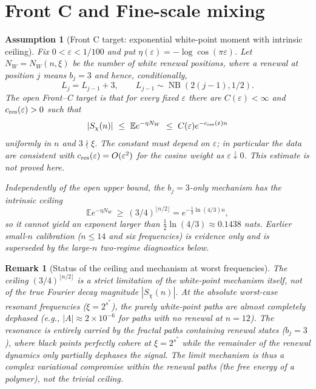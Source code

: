 \documentclass[12pt,a4paper]{article}
\newtheorem{remark}[theorem]{Remark}
\newtheorem{assumption}[theorem]{Assumption}
\begin{document}
\section{Front C and Fine-scale mixing}
\label{sec:front_c}

\begin{assumption}[Front C target: exponential white-point moment with intrinsic ceiling]
\label{lem:front_c2}
Fix $0<\varepsilon<1/100$ and put
$\eta(\varepsilon)=-\log\cos(\pi\varepsilon)$.  Let $N_W=N_W(n,\xi)$
be the number of white renewal positions, where a renewal at position $j$ means
$b_j=3$ and hence, conditionally,
\[
 L_j=L_{j-1}+3,\qquad L_{j-1}\sim\operatorname{NB}(2(j-1),1/2).
\]
The open Front--C target is that for every fixed $\varepsilon$ there are
$C(\varepsilon)<\infty$ and $c_{\rm res}(\varepsilon)>0$ such that
\[
 |S_\chi(n)|\ \le\ \mathbb E e^{-\eta N_W}
 \ \le\ C(\varepsilon)e^{-c_{\rm res}(\varepsilon)n}
\]
uniformly in $n$ and $3\nmid\xi$.  The constant must depend on $\varepsilon$;
in particular the data are consistent with
$c_{\rm res}(\varepsilon)=O(\varepsilon^2)$ for the cosine weight as
$\varepsilon\downarrow0$.  This estimate is not proved here.

Independently of the open upper bound, the $b_j=3$-only mechanism has the
intrinsic ceiling
\[
 \mathbb E e^{-\eta N_W}\ \ge\ (3/4)^{\lfloor n/2\rfloor}
 =e^{-\frac12\ln(4/3)n},
\]
so it cannot yield an exponent larger than
$\tfrac12\ln(4/3)\approx0.1438$ nats.  Earlier small-$n$ calibration
($n\le14$ and six frequencies) is evidence only and is superseded by the
large-$n$ two-regime diagnostics below.
\end{assumption}

\begin{remark}[Status of the ceiling and mechanism at worst frequencies]
The ceiling $(3/4)^{\lfloor n/2\rfloor}$ is a strict limitation of the white-point mechanism itself, not of the true Fourier decay magnitude $|S_\chi(n)|$. At the absolute worst-case resonant frequencies ($\xi = 2^{s^*}$), the purely white-point paths are almost completely dephased (e.g., $|A| \approx 2 \times 10^{-6}$ for paths with no renewal at $n=12$). The resonance is entirely carried by the fractal paths containing renewal states ($b_j = 3$), where black points perfectly cohere at $\xi = 2^{s^*}$ while the remainder of the renewal dynamics only partially dephases the signal. The limit mechanism is thus a complex variational compromise within the renewal paths (the free energy of a polymer), not the trivial ceiling.
\end{remark}
\end{document}
